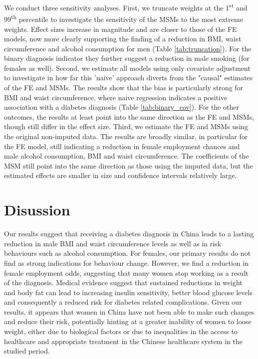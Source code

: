 We conduct three sensitivity analyses. First, we truncate weights at the 1\textsuperscript{st} and 99\textsuperscript{th} percentile to investigate the sensitivity of the \acp{MSM} to the most extreme weights. Effect sizes increase in magnitude and are closer to those of the \ac{FE} models, now more clearly supporting the finding of a reduction in \ac{BMI}, waist circumference and alcohol consumption for men (Table \ref{tab:truncation}). For the binary diagnosis indicator they further suggest a reduction in male smoking (for females as well). Second, we estimate all models using only covariate adjustment to investigate in how far this 'naive' approach diverts from the "causal" estimates of the \ac{FE} and \acp{MSM}. The results show that the bias is particularly strong for \ac{BMI} and waist circumference, where naive regression indicates a positive association with a diabetes diagnosis (Table \ref{tab:binary_cov}). For the other outcomes, the results at least point into the same direction as the \ac{FE} and \acp{MSM}, though still differ in the effect size. Third, we estimate the \ac{FE} and \acp{MSM} using the original non-imputed data. The results are broadly similar, in particular for the \ac{FE} model, still indicating a reduction in female employment chances and male alcohol consumption, \ac{BMI} and waist circumference. The coefficients of the \ac{MSM} still point into the same direction as those using the imputed data, but the estimated effects are smaller in size and confidence intervals relatively large.


\FloatBarrier


\section*{Disussion}

Our results suggest that receiving a diabetes diagnosis in China leads to a lasting reduction in male \ac{BMI} and waist circumference levels as well as in risk behaviours such as alcohol consumption. For females, our primary results do not find as strong indications for behaviour change. However, we find a reduction in female employment odds, suggesting that many women stop working as a result of the diagnosis.
Medical evidence suggest that sustained reductions in weight and body fat can lead to increasing insulin sensitivity, better blood glucose levels and consequently a reduced risk for diabetes related complications. Given our results, it appears that women in China have not been able to make such changes and reduce their risk, potentially hinting at a greater inability of women to loose weight, either due to biological factors or due to inequalities in the access to healthcare and appropriate treatment in the Chinese healthcare system in the studied period. 

